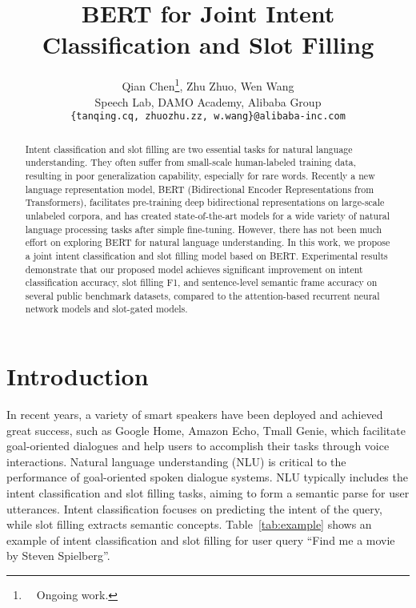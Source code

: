 \documentclass[11pt,a4paper]{article}
\title{BERT for Joint Intent Classification and Slot Filling}
\author{Qian Chen\thanks{~~Ongoing work.}, Zhu Zhuo, Wen Wang \\
  Speech Lab, DAMO Academy, Alibaba Group \\
  {\tt \{tanqing.cq,~zhuozhu.zz,~w.wang\}@alibaba-inc.com}
}
\date{}
\begin{document}
\maketitle
\begin{abstract}
Intent classification and slot filling are two essential tasks for natural language understanding. They often suffer from small-scale human-labeled training data, resulting in poor generalization capability, especially for rare words. Recently a new language representation model, BERT (Bidirectional Encoder Representations from Transformers), facilitates pre-training deep bidirectional representations on large-scale unlabeled corpora, and has created state-of-the-art models for a wide variety of natural language processing tasks after simple fine-tuning. However, there has not been much effort on exploring BERT for natural language understanding. In this work, we propose a joint intent classification and slot filling model based on BERT. Experimental results demonstrate that our proposed model achieves significant improvement on intent classification accuracy, slot filling F1, and sentence-level semantic frame accuracy on several public benchmark datasets, compared to the attention-based recurrent neural network models and slot-gated models.
\end{abstract}

\section{Introduction}
In recent years, a variety of smart speakers have been deployed and achieved great success, such as Google Home, Amazon Echo, Tmall Genie, which facilitate goal-oriented dialogues and help users to accomplish their tasks through voice interactions. Natural language understanding (NLU) is critical to the performance of goal-oriented spoken dialogue systems. NLU typically includes the intent classification and slot filling tasks, aiming to form a semantic parse for user utterances. Intent classification focuses on predicting the intent of the query, while slot filling extracts semantic concepts. Table~\ref{tab:example} shows an example of intent classification and slot filling for user query ``Find me a movie by Steven Spielberg''.
\begin{table}[ht]
\begin{center}
\end{center}
\caption{An example from user query to semantic frame.}
\label{tab:example}
\end{table}
\end{document}
